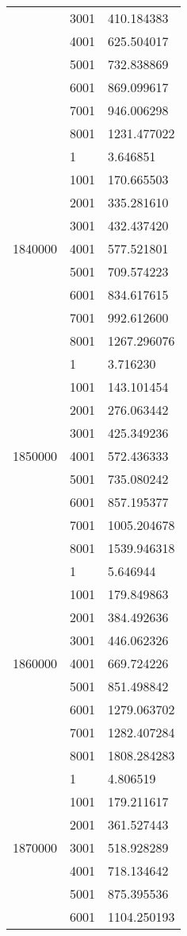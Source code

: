 \begin{table}[htb!]
\begin{tabular}{lll}
 & 3001 & 410.184383 \\
 & 4001 & 625.504017 \\
 & 5001 & 732.838869 \\
 & 6001 & 869.099617 \\
 & 7001 & 946.006298 \\
 & 8001 & 1231.477022 \\
\multirow[c]{9}{*}{1840000} & 1 & 3.646851 \\
 & 1001 & 170.665503 \\
 & 2001 & 335.281610 \\
 & 3001 & 432.437420 \\
 & 4001 & 577.521801 \\
 & 5001 & 709.574223 \\
 & 6001 & 834.617615 \\
 & 7001 & 992.612600 \\
 & 8001 & 1267.296076 \\
\multirow[c]{9}{*}{1850000} & 1 & 3.716230 \\
 & 1001 & 143.101454 \\
 & 2001 & 276.063442 \\
 & 3001 & 425.349236 \\
 & 4001 & 572.436333 \\
 & 5001 & 735.080242 \\
 & 6001 & 857.195377 \\
 & 7001 & 1005.204678 \\
 & 8001 & 1539.946318 \\
\multirow[c]{9}{*}{1860000} & 1 & 5.646944 \\
 & 1001 & 179.849863 \\
 & 2001 & 384.492636 \\
 & 3001 & 446.062326 \\
 & 4001 & 669.724226 \\
 & 5001 & 851.498842 \\
 & 6001 & 1279.063702 \\
 & 7001 & 1282.407284 \\
 & 8001 & 1808.284283 \\
\multirow[c]{9}{*}{1870000} & 1 & 4.806519 \\
 & 1001 & 179.211617 \\
 & 2001 & 361.527443 \\
 & 3001 & 518.928289 \\
 & 4001 & 718.134642 \\
 & 5001 & 875.395536 \\
 & 6001 & 1104.250193 \\

\end{tabular}
\end{table}
